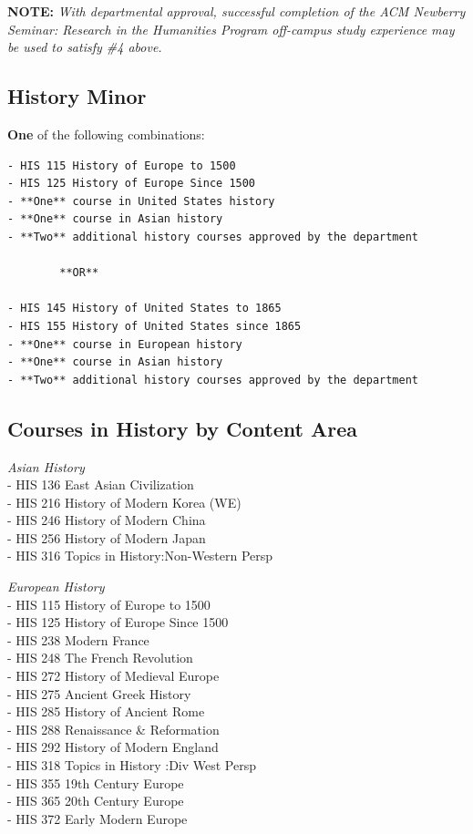 \documentclass[
  letterpaper,
]{scrbook}
\begin{document}
\textbf{NOTE:} \emph{With departmental approval, successful completion
of the ACM Newberry Seminar: Research in the Humanities Program
off-campus study experience may be used to satisfy \#4 above.}

\subsection{History Minor}\label{history-minor}

\textbf{One} of the following combinations:

\begin{verbatim}
- HIS 115 History of Europe to 1500
- HIS 125 History of Europe Since 1500
- **One** course in United States history
- **One** course in Asian history
- **Two** additional history courses approved by the department

        **OR**

- HIS 145 History of United States to 1865
- HIS 155 History of United States since 1865
- **One** course in European history
- **One** course in Asian history
- **Two** additional history courses approved by the department
\end{verbatim}

\subsection{Courses in History by Content
Area}\label{courses-in-history-by-content-area}

\emph{Asian History}\\
- HIS 136 East Asian Civilization\\
- HIS 216 History of Modern Korea (WE)\\
- HIS 246 History of Modern China\\
- HIS 256 History of Modern Japan\\
- HIS 316 Topics in History:Non-Western Persp

\emph{European History}\\
- HIS 115 History of Europe to 1500\\
- HIS 125 History of Europe Since 1500\\
- HIS 238 Modern France\\
- HIS 248 The French Revolution\\
- HIS 272 History of Medieval Europe\\
- HIS 275 Ancient Greek History\\
- HIS 285 History of Ancient Rome\\
- HIS 288 Renaissance \& Reformation\\
- HIS 292 History of Modern England\\
- HIS 318 Topics in History :Div West Persp\\
- HIS 355 19th Century Europe\\
- HIS 365 20th Century Europe\\
- HIS 372 Early Modern Europe
\end{document}
